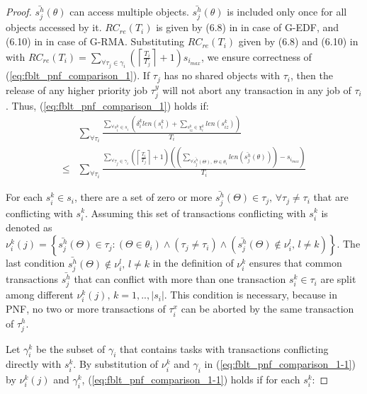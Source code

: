 \documentclass[prodmode,acmtecs]{acmsmall}
\begin{document}
\begin{compactenum}
\begin{proof}
$\bar{s_{j}^{h}}(\theta)$ can access multiple objects. $\bar{s_{j}^{h}}(\theta)$
is included only once for all objects accessed by it. $RC_{re}(T_{i})$
is given by (6.8) in \cite{shambake_phd_proposal} in case of G-EDF,
and (6.10) in \cite{shambake_phd_proposal} in case of G-RMA. Substituting $RC_{re}(T_{i})$ given by (6.8) and (6.10) in \cite{shambake_phd_proposal} with $RC_{re}(T_{i})=\sum_{\forall\tau_{j}\in\gamma_{i}}\left(\left\lceil \frac{T_{i}}{T_{j}}\right\rceil +1\right)s_{i_{max}}$, we ensure correctness of (\ref{eq:fblt_pnf_comparison_1}). If $\tau_{j}$ has no shared objects with $\tau_{i}$, then the release of
any higher priority job $\tau_{j}^{y}$ will not abort any transaction
in any job of $\tau_{i}$. Thus, (\ref{eq:fblt_pnf_comparison_1}) holds
if:
\begin{eqnarray}
 & \sum_{\forall\tau_{i}}\frac{\sum_{\forall s_{i}^{k}\in s_{i}}\left(\delta_{i}^{k}len(s_{i}^{k})+\sum_{s_{iz}^{k}\in\chi_{i}^{k}}len(s_{iz}^{k})\right)}{T_{i}}\label{eq:fblt_pnf_comparison_1-1}\\
\le & \sum_{\forall\tau_{i}}\frac{\sum_{\forall\tau_{j}\in\gamma_{i}}\left(\left\lceil \frac{T_{i}}{T_{j}}\right\rceil +1\right)\left(\left(\sum_{\forall\bar{s_{j}^{h}}(\Theta),\,\Theta\in\theta_{i}}len\left(\bar{s_{j}^{h}}(\theta)\right)\right)-s_{i_{max}}\right)}{T_{i}}\nonumber 
\end{eqnarray}

For each $s_{i}^{k}\in s_{i}$, there are a set of zero or more $\bar{s_{j}^{h}}(\Theta)\in\tau_{j},\,\forall\tau_{j}\ne\tau_{i}$
that are conflicting with $s_{i}^{k}$. Assuming this set of 
transactions conflicting with $s_{i}^{k}$ is denoted as $\nu_{i}^{k}(j)=\left\{ \bar{s_{j}^{h}}(\Theta)\in\tau_{j}:\left(\Theta\in\theta_{i}\right)\wedge\left(\tau_{j}\ne\tau_{i}\right)\wedge\left(\bar{s_{j}^{h}}(\Theta)\not\in\nu_{i}^{l},\, l\ne k\right)\right\} $.
The last condition $\bar{s_{j}^{h}}(\Theta)\not\in\nu_{i}^{l},\, l\ne k$
in the definition of $\nu_{i}^{k}$ ensures that common transactions
$\bar{s_{j}^{h}}$ that can conflict with more than one transaction
$s_{i}^{k}\in\tau_{i}$ are split among different $\nu_{i}^{k}(j),\, k=1,..,|s_{i}|$.
This condition is necessary, because in PNF, no two or more transactions of $\tau_{i}^{x}$ can be aborted by the same transaction of $\tau_{j}^{h}$.

Let $\gamma_{i}^{k}$ be the subset of $\gamma_{i}$ that contains tasks
with transactions conflicting directly with $s_{i}^{k}$. By substitution of $\nu_i^k$ and $\gamma_i$ in (\ref{eq:fblt_pnf_comparison_1-1}) by $\nu_{i}^{k}(j)$ and $\gamma_{i}^{k}$,
(\ref{eq:fblt_pnf_comparison_1-1}) holds if for each $s_{i}^{k}$:


\end{proof}
\end{compactenum}
\end{document}
